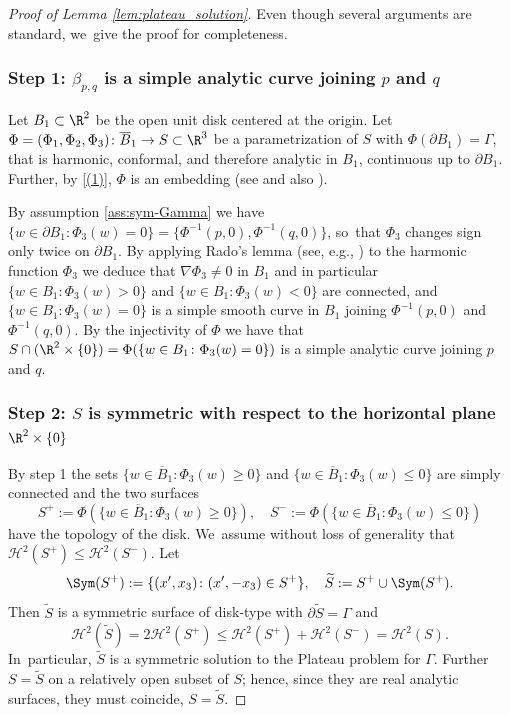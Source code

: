 \begin{proof}[Proof of Lemma \ref{lem:plateau_solution}]
Even though several arguments are
standard, we~give the proof for completeness.

\subsubsection*{Step 1: $\beta_{p,q}$ is a simple analytic curve joining $p$ and $q$}
Let $B_1\subset\R^2$ be the open unit disk centered at the origin. Let $\Phi=(\Phi_1,\Phi_2,\Phi_3)\colon\overline{B}_1\to S\subset\R^3$
be a parametrization of $S$ with $\Phi(\partial B_1)=\Gamma$,
that is harmonic, conformal, and therefore analytic in $B_1$, continuous up to $\partial B_1$.
Further, by \ref{(1)},
$\Phi$ is an embedding (see \cite{MY} and also \cite[p.\,343]{DHS}).

By assumption \eqref{ass:sym-Gamma} we have $\{w\in\partial B_1\colon\Phi_3(w)=0\}=\{\Phi^{-1}(p,0),\Phi^{-1}(q,0)\}$, so~that $\Phi_3$ changes sign only twice on $\partial B_1$. By applying Rado's lemma (see, e.g., \cite[Lem.\,2, p.\,295]{DHS}) to the harmonic function $\Phi_3$ we deduce that $\nabla\Phi_3\ne0$ in $B_1$ and in particular $\{w\in B_1\colon\Phi_3(w)>0\}$ and $\{w\in B_1\colon\Phi_3(w)<0\}$
are connected, and $\{w\in B_1\colon\Phi_3(w)=0\}$ is a simple smooth curve in $B_1$ joining $\Phi^{-1}(p,0)$ and $\Phi^{-1}(q,0)$.
By the injectivity of $\Phi$ we have that $S\cap(\R^2\times\{0\})=\Phi(\{w\in B_1\colon\Phi_3(w)=0\})$ is a simple analytic curve joining $p$ and $q$.

\subsubsection*{Step 2: $S$ is symmetric with respect to the horizontal plane $\R^2\times\{0\}$}
By step 1 the sets $\{w\in \overline B_1\colon\Phi_3(w)\ge0\}$ and $\{w\in \overline B_1\colon\Phi_3(w)\le0\}$ are simply connected and the two surfaces
\[
S^+:=\Phi(\{w\in \overline B_1\colon\Phi_3(w)\ge0\}),\quad S^-:=\Phi(\{w\in \overline B_1\colon\Phi_3(w)\le0\})
\]
have the topology of the disk. We~assume without loss of generality that $\mathcal{H}^2(S^+)\le \mathcal{H}^2(S^-)$. Let
\[
\Sym(S^+):=\{(x',x_3)\colon (x',-x_3)\in S^+\},\quad \widetilde S:= S^+\cup\Sym(S^+).
\]
Then $\widetilde S$ is a symmetric surface of disk-type with $\partial\widetilde S =\Gamma$ and
\begin{equation*}
\mathcal{H}^2(\widetilde S)=2\mathcal{H}^2(S^+)\le\mathcal{H}^2(S^+)+\mathcal{H}^2(S^-)=\mathcal{H}^2(S).
\end{equation*}
In~particular, $\widetilde S$ is a symmetric solution to the
Plateau problem for $\Gamma$. Further $S=\widetilde S$ on a relatively
open subset of $S$; hence, since they are real
analytic surfaces, they must coincide, $S=\widetilde S$.


\end{proof}
